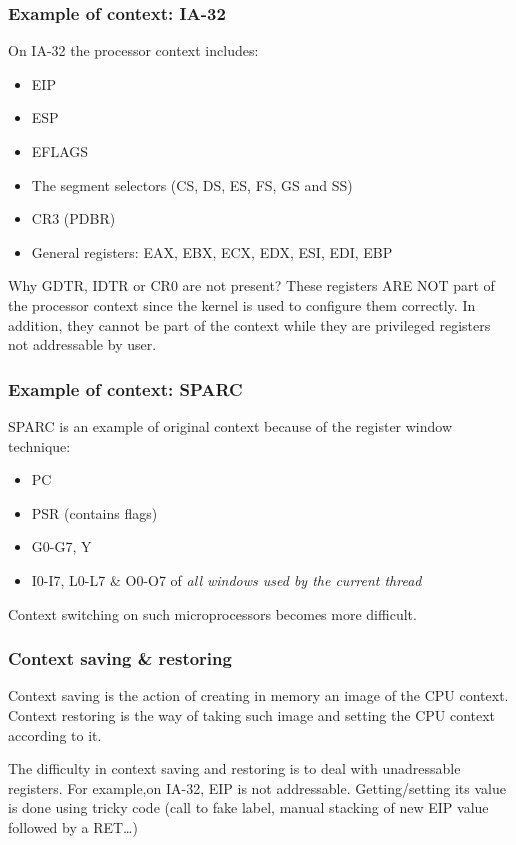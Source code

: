 
\begin{frame}
  \frametitle{Example of context: IA-32}

  On IA-32 the processor context includes:

  \begin{itemize}
  \item
    EIP
  \item
    ESP
  \item
    EFLAGS
  \item
    The segment selectors (CS, DS, ES, FS, GS and SS)
  \item
    CR3 (PDBR)
  \item
    General registers: EAX, EBX, ECX, EDX, ESI, EDI, EBP
  \end{itemize}

  \-

  Why GDTR, IDTR or CR0 are not present? These registers ARE NOT part
  of the processor context since the kernel is used to configure them
  correctly. In addition, they cannot be part of the context while
  they are privileged registers not addressable by user.

\end{frame}


\begin{frame}
  \frametitle{Example of context: SPARC}

  SPARC is an example of original context because of the register
  window technique:

  \begin{itemize}
  \item
    PC
  \item
    PSR (contains flags)
  \item
    G0-G7, Y
  \item
    I0-I7, L0-L7 \& O0-O7 of \emph{all windows used by the current thread}
  \end{itemize}

  \-

  Context switching on such microprocessors becomes more difficult.

\end{frame}


\begin{frame}
  \frametitle{Context saving \& restoring}

  Context saving is the action of creating in memory an image of the
  CPU context. Context restoring is the way of taking such image and
  setting the CPU context according to it.

  \-

  The difficulty in context saving and restoring is to deal with
  unadressable registers. For example,on IA-32, EIP is not
  addressable. Getting/setting its value is done using tricky code
  (call to fake label, manual stacking of new EIP value followed by a
  RET\ldots)

\end{frame}

